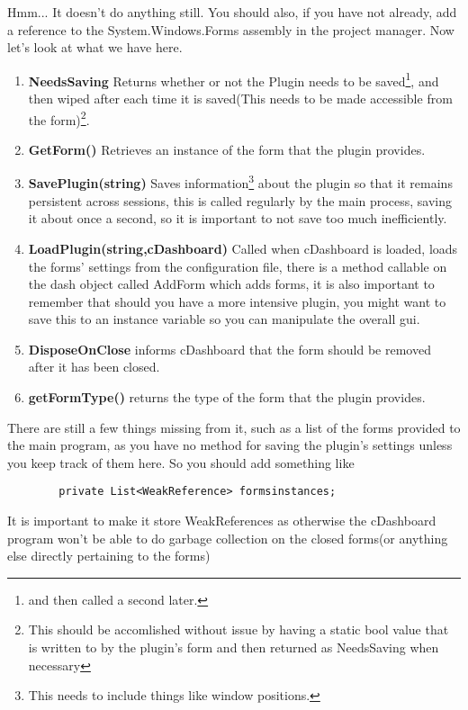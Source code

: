\documentclass{article}
\begin{document}
 Hmm... It doesn't do anything still. You should also, if you have not already, add a reference to the System.Windows.Forms assembly in the project manager. Now let's look at what we have here.
 \begin{enumerate}
 \item \textbf{NeedsSaving} Returns whether or not the Plugin needs to be saved\footnote{and then called a second later.}, and then wiped after each time it is saved(This needs to be made accessible from the form)\footnote{This should be accomlished without issue by having a static bool value that is written to by the plugin's form and then returned as NeedsSaving when necessary}.
 \item \textbf{GetForm() } Retrieves an instance of the form that the plugin provides.
 \item \textbf{SavePlugin(string)} Saves information\footnote{ This needs to include things like window positions.} about the plugin so that it remains persistent across sessions, this is called regularly by the main process, saving it about once a second, so it is important to not save too much inefficiently.
 \item \textbf{LoadPlugin(string,cDashboard)} Called when cDashboard is loaded, loads the forms' settings from the configuration file, there is a method callable on the dash object called AddForm which adds forms, it is also important to remember that should you have a more intensive plugin, you might want to save this to an instance variable so you can manipulate the overall gui.
 \item \textbf{DisposeOnClose} informs cDashboard that the form should be removed after it has been closed. 
 \item \textbf{getFormType()} returns the type of the form that the plugin provides.
 \end{enumerate}
 
 There are still a few things missing from it, such as a list of the forms provided to the main program, as you have no method for saving the plugin's settings unless you keep track of them here. So you should add something like 
 \begin{lstlisting}
 		private List<WeakReference> formsinstances;
 \end{lstlisting}
 
 It is important to make it store WeakReferences as otherwise the cDashboard program won't be able to do garbage collection on the closed forms(or anything else directly pertaining to the forms)
 
\end{document}

